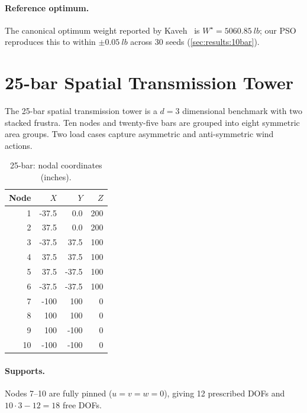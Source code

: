 \paragraph{Reference optimum.} The canonical optimum weight
reported by Kaveh~\cite{kaveh2010} is $W^\star=\SI{5060.85}{lb}$;
our PSO reproduces this to within $\pm\SI{0.05}{lb}$ across 30
seeds (\cref{sec:results:10bar}).

\section{25-bar Spatial Transmission Tower}
\label{app:geom:25bar}

The 25-bar spatial transmission tower is a $d=3$ dimensional
benchmark with two stacked frustra. Ten nodes and twenty-five
bars are grouped into eight symmetric area groups. Two load
cases capture asymmetric and anti-symmetric wind actions.

\begin{table}[h]
  \centering
  \small
  \caption{25-bar: nodal coordinates (inches).}
  \label{tab:geom:25bar:nodes}
  \begin{tabular}{rrrr}
  \toprule
  Node & $X$ & $Y$ & $Z$ \\
  \midrule
  1 & -37.5 &  0.0 & 200 \\
  2 &  37.5 &  0.0 & 200 \\
  3 & -37.5 &  37.5 & 100 \\
  4 &  37.5 &  37.5 & 100 \\
  5 &  37.5 & -37.5 & 100 \\
  6 & -37.5 & -37.5 & 100 \\
  7 & -100  &  100  &   0 \\
  8 &  100  &  100  &   0 \\
  9 &  100  & -100  &   0 \\
  10 & -100 & -100  &   0 \\
  \bottomrule
  \end{tabular}
\end{table}

\paragraph{Supports.} Nodes 7--10 are fully pinned ($u=v=w=0$),
giving 12 prescribed DOFs and $10\cdot 3-12=18$ free DOFs.

